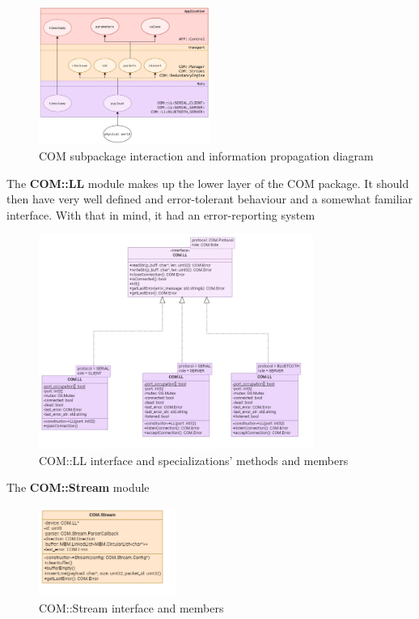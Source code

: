 \begin{figure}[H]
	\centering
	\includegraphics[width=0.5\textwidth]{./img/module-stack-com.png}
	\caption {COM subpackage interaction and information propagation diagram}
	\label{fig:navig-module-stack-com}
	\end{figure}



The \textbf{COM::LL} module makes up the lower layer of the COM package. It should then have very well defined and error-tolerant behaviour and a somewhat familiar interface. With that in mind, it had an error-reporting system

\begin{figure}[H]
	\centering
	\includegraphics[width=0.8\textwidth]{./img/navig-class-ll.png}
	\caption {COM::LL interface and specializations' methods and members}
	\label{fig:navig-class-ll}
	\end{figure}


The \textbf{COM::Stream} module 

\begin{figure}[H]
	\centering
	\includegraphics[width=0.4\textwidth]{./img/navig-class-stream.png}
	\caption {COM::Stream interface and members}
	\label{fig:navig-class-stream}
	\end{figure}


